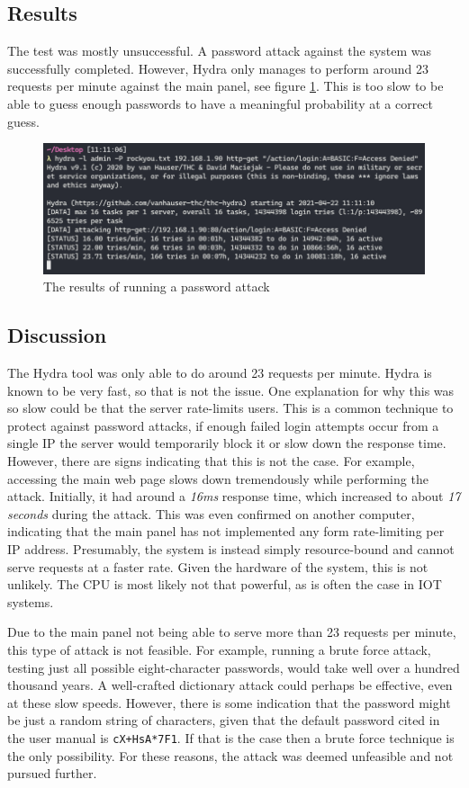 \subsection{Results}
The test was mostly unsuccessful. A password attack against the system was successfully completed. However, Hydra only manages to perform around 23 requests per minute against the main panel, see figure \ref{fig:hydra-password-attack}. This is too slow to be able to guess enough passwords to have a meaningful probability at a correct guess.
\begin{figure}[!ht]
    \centering
    \includegraphics[width=\textwidth]{images/6-pentesting/hydra-results.png}
    \caption{The results of running a password attack}
    \label{fig:hydra-password-attack}
\end{figure}

\subsection{Discussion}
The Hydra tool was only able to do around 23 requests per minute. Hydra is known to be very fast, so that is not the issue. One explanation for why this was so slow could be that the server rate-limits users. This is a common technique to protect against password attacks, if enough failed login attempts occur from a single IP the server would temporarily block it or slow down the response time. However, there are signs indicating that this is not the case. For example, accessing the main web page slows down tremendously while performing the attack. Initially, it had around a \textit{16ms} response time, which increased to about \textit{17 seconds} during the attack. This was even confirmed on another computer, indicating that the main panel has not implemented any form rate-limiting per IP address. Presumably, the system is instead simply resource-bound and cannot serve requests at a faster rate. Given the hardware of the system, this is not unlikely. The CPU is most likely not that powerful, as is often the case in \gls{IOT} systems.

Due to the main panel not being able to serve more than 23 requests per minute, this type of attack is not feasible. For example, running a brute force attack, testing just all possible eight-character passwords, would take well over a hundred thousand years. A well-crafted dictionary attack could perhaps be effective, even at these slow speeds. However, there is some indication that the password might be just a random string of characters, given that the default password cited in the user manual is \texttt{cX+HsA*7F1}. If that is the case then a brute force technique is the only possibility. For these reasons, the attack was deemed unfeasible and not pursued further.
